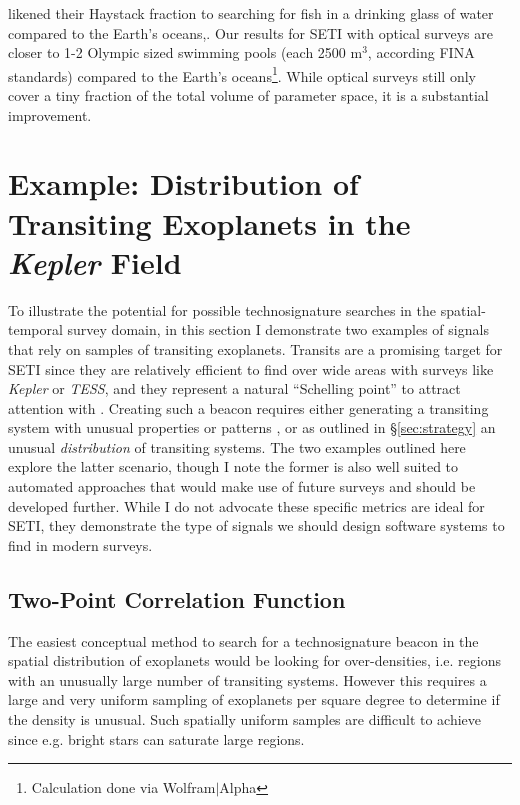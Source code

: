 \documentclass[twocolumn]{aastex62}
\newcommand{\Kepler}{\textsl{Kepler}\xspace}
\newcommand{\TESS}{\textsl{TESS}\xspace}
\begin{document}
\citet{wright2018c} likened their Haystack fraction to searching for fish in a drinking glass of water compared to the Earth's oceans,. Our results for SETI with optical surveys are closer to 1-2 Olympic sized swimming pools (each 2500 m$^3$, according FINA standards) compared to the Earth's oceans\footnote{Calculation done via Wolfram$|$Alpha}. While optical surveys still only cover a tiny fraction of the total volume of parameter space, it is a substantial improvement.




\section{Example: Distribution of Transiting Exoplanets in the {\it Kepler} Field}
\label{sec:transit}

To illustrate the potential for possible technosignature searches in the spatial-temporal survey domain, in this section I demonstrate two examples of signals that rely on samples of transiting exoplanets. Transits are a promising target for SETI since they are relatively efficient to find over wide areas with surveys like \Kepler \citep{borucki2010} or \TESS, and they represent a natural ``Schelling point'' to attract attention with \citep{wright2017}. Creating such a beacon requires either generating a transiting system with unusual properties or patterns \citep[e.g.][]{arnold2005,kipping2016,forgan2017}, or as outlined in \S\ref{sec:strategy} an unusual {\it distribution} of transiting systems. The two examples outlined here explore the latter scenario, though I note the former is also well suited to automated approaches that would make use of future surveys and should be developed further. While I do not advocate these specific metrics are ideal for SETI, they demonstrate the type of signals we should design software systems to find in modern surveys.


\subsection{Two-Point Correlation Function}
\label{sec:2pt}

The easiest conceptual method to search for a technosignature beacon in the spatial distribution of exoplanets would be looking for over-densities, i.e. regions with an unusually large number of transiting systems. However this requires a large and very uniform sampling of exoplanets per square degree to determine if the density is unusual. Such spatially uniform samples are difficult to achieve since e.g. bright stars can saturate large regions.
\end{document}

